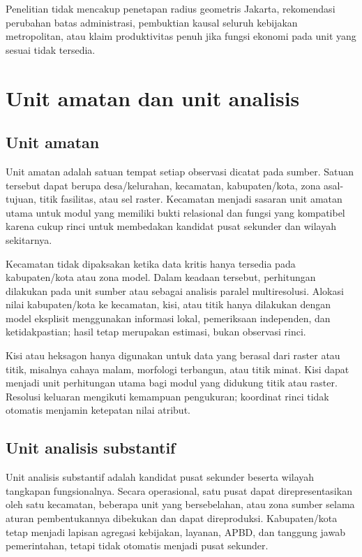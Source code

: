 \documentclass[11pt,a4paper,oneside,openany,indonesian]{report}
\begin{document}
Penelitian tidak mencakup penetapan radius geometris Jakarta,
rekomendasi perubahan batas administrasi, pembuktian kausal seluruh
kebijakan metropolitan, atau klaim produktivitas penuh jika fungsi
ekonomi pada unit yang sesuai tidak tersedia.

\section{Unit amatan dan unit
analisis}\label{unit-amatan-dan-unit-analisis}

\subsection{Unit amatan}\label{unit-amatan}

Unit amatan adalah satuan tempat setiap observasi dicatat pada sumber.
Satuan tersebut dapat berupa desa/kelurahan, kecamatan, kabupaten/kota,
zona asal-tujuan, titik fasilitas, atau sel raster. Kecamatan menjadi
sasaran unit amatan utama untuk modul yang memiliki bukti relasional dan
fungsi yang kompatibel karena cukup rinci untuk membedakan kandidat
pusat sekunder dan wilayah sekitarnya.

Kecamatan tidak dipaksakan ketika data kritis hanya tersedia pada
kabupaten/kota atau zona model. Dalam keadaan tersebut, perhitungan
dilakukan pada unit sumber atau sebagai analisis paralel multiresolusi.
Alokasi nilai kabupaten/kota ke kecamatan, kisi, atau titik hanya
dilakukan dengan model eksplisit menggunakan informasi lokal, pemeriksaan
independen, dan ketidakpastian; hasil tetap merupakan estimasi, bukan
observasi rinci.

Kisi atau heksagon hanya digunakan untuk data yang berasal dari raster
atau titik, misalnya cahaya malam, morfologi terbangun, atau titik
minat. Kisi dapat menjadi unit perhitungan utama bagi modul yang
didukung titik atau raster. Resolusi keluaran mengikuti kemampuan
pengukuran; koordinat rinci tidak otomatis menjamin ketepatan nilai
atribut.

\subsection{Unit analisis
substantif}\label{unit-analisis-substantif}

Unit analisis substantif adalah kandidat pusat sekunder beserta wilayah
tangkapan fungsionalnya. Secara operasional, satu pusat dapat
direpresentasikan oleh satu kecamatan, beberapa unit yang bersebelahan,
atau zona sumber selama aturan pembentukannya dibekukan dan dapat
direproduksi. Kabupaten/kota tetap menjadi lapisan agregasi kebijakan,
layanan, APBD, dan tanggung jawab pemerintahan, tetapi tidak otomatis
menjadi pusat sekunder.
\end{document}

